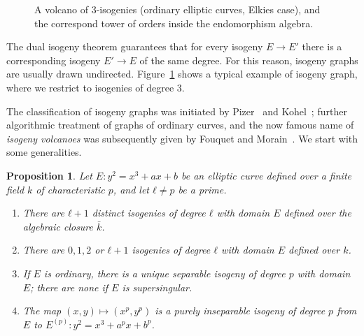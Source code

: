 \documentclass[10pt]{article}
\theoremstyle{plain}
\newtheorem{proposition}[theorem]{Proposition}
\theoremstyle{definition}
\DeclareMathOperator{\End}{End} %
\def\O{\ensuremath{\mathcal{O}}}
\begin{document}
\begin{figure}
  \centering
  
    \caption{A volcano of $3$-isogenies (ordinary elliptic curves,
      Elkies case), and the correspond tower of orders inside the
      endomorphism algebra.}
  \label{fig:volcano}
\end{figure}

The dual isogeny theorem guarantees that for every isogeny $E\to E'$
there is a corresponding isogeny $E'\to E$ of the same degree. %
For this reason, isogeny graphs are usually drawn undirected. %
Figure~\ref{fig:volcano} shows a typical example of isogeny graph,
where we restrict to isogenies of degree $3$.

The classification of isogeny graphs was initiated by
Pizer~\cite{pizer1,pizer2} and Kohel~\cite{kohel}; further algorithmic
treatment of graphs of ordinary curves, and the now famous name of
\emph{isogeny volcanoes} was subsequently given by Fouquet and
Morain~\cite{fouquet+morain02}. %
We start with some generalities.

\begin{proposition}
  \label{th:isog-count}
  Let $E:y^2=x^3+ax+b$ be an elliptic curve defined over a finite
  field $k$ of characteristic $p$, and let $ℓ≠p$ be a prime.

  \begin{enumerate}
  \item There are $ℓ+1$ distinct isogenies of degree $ℓ$ with domain
    $E$ defined over the algebraic closure $\bar{k}$.
  \item There are $0,1,2$ or $ℓ+1$ isogenies of degree $ℓ$ with domain
    $E$ defined over $k$.
  \item If $E$ is ordinary, there is a unique separable isogeny of
    degree $p$ with domain $E$; there are none if $E$ is
    supersingular.
  \item The map $(x,y)\mapsto(x^p,y^p)$ is a purely inseparable
    isogeny of degree $p$ from $E$ to $E^{(p)}:y^2=x^3+a^px+b^p$.
  \end{enumerate}
\end{proposition}
\end{document}
